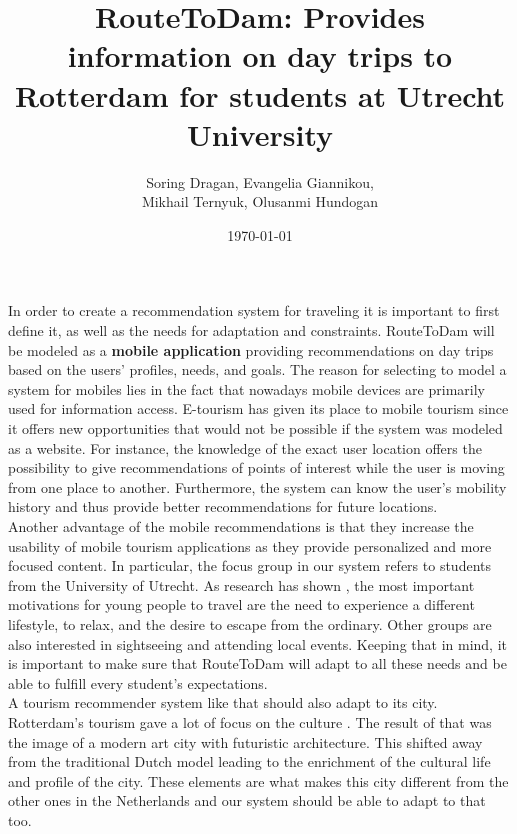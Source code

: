 \documentclass[12pt,a4paper,oneside]{article}
\title{RouteToDam: Provides information on day trips to Rotterdam for students at Utrecht University}
\date{\today}
\author{Soring Dragan, Evangelia Giannikou, \\Mikhail Ternyuk, Olusanmi Hundogan}
\begin{document}
\maketitle

In order to create a recommendation system for traveling it is important to first define it, as well as the needs for adaptation and constraints. RouteToDam will be modeled as a \textbf{mobile application} providing recommendations on day trips based on the users’ profiles, needs, and goals. The reason for selecting to model a system for mobiles lies in the fact that nowadays mobile devices are primarily used for information access. E-tourism \cite{mobile_recommendation_systems} has given its place to mobile tourism since it offers new opportunities that would not be possible if the system was modeled as a website. For instance, the knowledge of the exact user location offers the possibility to give recommendations of points of interest while the user is moving from one place to another. Furthermore, the system can know the user’s mobility history and thus provide better recommendations for future locations.\\

Another advantage of the mobile recommendations is that they increase the usability of mobile tourism applications as they provide personalized and more focused content. In particular, the focus group in our system refers to students from the University of Utrecht. As research has shown \cite{rita2019millennials}, the most important motivations for young people to travel are the need to experience a different lifestyle, to relax, and the desire to escape from the ordinary. Other groups are also interested in sightseeing and attending local events. Keeping that in mind, it is important to make sure that RouteToDam will adapt to all these needs and be able to fulfill every student’s expectations.\\

A tourism recommender system like that should also adapt to its city. Rotterdam’s tourism gave a lot of focus on the culture \cite{rotterdam}. The result of that was the image of a modern art city with futuristic architecture. This shifted away from the traditional Dutch model leading to the enrichment of the cultural life and profile of the city. These elements are what makes this city different from the other ones in the Netherlands and our system should be able to adapt to that too. \\
\end{document}
